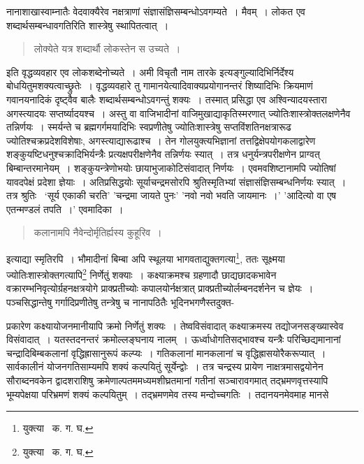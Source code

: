 \documentclass[11pt, openany]{book}
\begin{document}
\newpage

\noindent नानाशाखास्वाम्नातैः वेदवाक्यैरेव नक्षत्राणां संज्ञासंज्ञिसम्बन्धोऽवगम्यते~। मैवम्~। लोकत एव शब्दार्थसम्बन्धावगतिरिति शास्त्रेषु स्थापितत्वात्~।
\begin{quote} 
{\qt लोक्येते यत्र शब्दार्थौ लोकस्तेन स उच्यते~।}
\end{quote}

\noindent इति वृद्धव्यवहार एव लोकशब्देनोच्यते~। अमी विचृतौ नाम तारके इत्यङ्गुल्यादिभिर्निर्देश्य बोधयितुमशक्यत्वाच्छ्रुतेः~। वृद्धव्यवहारे
तु गामानयेत्यादिवाक्यप्रयोगानन्तरं शिष्यादिभिः क्रियमाणं गवानयनादिकं दृष्ट्वैव बालैः शब्दार्थसम्बन्धोऽवगन्तुं शक्यः~। तस्मात् प्रसिद्धा एव
अश्विन्यादयस्तारा अगस्त्यादयः सप्तर्ष्यादयश्च~। अस्तु वा वाजिभादीनां वाजिमुखाद्याकृतिस्मरणात् ज्योतिःशास्त्रोक्तलक्षणेनैव तन्निर्णयः~।
स्मर्यन्ते च ब्रह्मगर्गमयादिभिः स्वप्रणीतेषु ज्योतिःशास्त्रेषु सप्तविंशतिनक्षत्रारूढ ज्योतिश्चक्रप्रदेशविशेषाः, अगस्त्याद्यारूढाश्च~। तेन गोलयुक्त्यभिज्ञानां
तत्तद्विक्षेपयोगकलाद्वारेण शङ्कुयष्टिधनुश्चक्रादिभिर्यन्त्रैः प्रत्यक्षपरीक्षणेनैव तन्निर्णयः स्यात्~। तत्र धनुर्यन्त्रपरीक्षणेन प्राग्वत् बिम्बान्तरमानेयम्~।
शङ्कुयन्त्रेणोभयोः छायाभुजाकोटिसंवादात् निर्णयः~। एवमवशिष्टानामपि ज्योतिषां यावदपेक्षं प्रदेशा ज्ञेयाः~। अतिप्रसिद्धयोः
सूर्याचन्द्रमसोरपि श्रुतिस्मृतिभ्यां संज्ञासंज्ञिसम्बन्धनिर्णयः स्यात्~। तत्र श्रुतिः \textendash\ `{\qt सूर्य एकाकी चरति}' '{\qt चन्द्रमा जायते पुनः}' '{\qt नवो नवो भवति
जायमानः~।}' '{\qt आदित्यो वा एष एतन्मण्डलं तपति~।}' एवमादिका~।

\begin{quote}
{\qt कलानामपि नैवेन्दोर्मृतिर्ह्यस्य कुहूरिव~।} 
\end{quote} 

\noindent इत्याद्या स्मृतिरपि~। भौमादीनां बिम्बा अपि स्थूलया भागवताद्युक्तगत्या\renewcommand{\thefootnote}{१}\footnote{युक्त्या \textendash\ क. ग. घ.}, ततः सूक्ष्मया ज्योतिःशास्त्रोक्तगत्यापि\renewcommand{\thefootnote}{२}\footnote{युक्त्या \textendash\ क. ग. घ.} निर्णेतुं
शक्याः~। कक्ष्याक्रमश्च ग्रहणादौ छाद्यछादकभावेन वक्रारम्भनिवृत्योर्ग्रहनक्षत्रयोगे प्राक्प्रतीच्योः कपालयोर्नक्षत्रात् प्राक्प्रतीच्योर्लम्बनदर्शनेन च
ज्ञेयः~। पञ्चसिद्धान्तेषु गर्गादिप्रणीतेषु तन्त्रेषु च नानापठितैः भूदिनभगणैस्तदुक्त- 

\newpage

\noindent प्रकारेण कक्ष्यायोजनमानीयापि क्रमो निर्णेतुं शक्यः~। तेष्वविसंवादात् कक्ष्याक्रमस्य तद्योजनसङ्ख्यास्वेव विसंवादात्~। यतस्तदनन्तरं क्रमोल्लङ्घनाय नालम्~। ऊर्ध्वाधोगतिसद्भावश्च यन्त्रैः परिच्छिद्यमानानां चन्द्रादिबिम्बकलानां वृद्धिह्रासानुरूपं कल्प्यः~। गतिकलानां मानकलानां च वृद्धिह्रासयोरैकरूप्यात्~। सार्वकालीनं योजनगतिसाम्यमपि शक्यं कल्पयितुं सूर्येन्द्वोः~। तत्र चन्द्रस्य प्रायेण नाक्षत्रमासद्वयोनेन
सौराब्दनवकेन द्वादशराशिषु क्रमेणाल्पतममध्यमशीघ्रतमानां गतीनां सञ्चारावगमात् तद्भ्रमणवृत्तस्यापि भूम्यपेक्षया परिभ्रमणं शक्यं
कल्पयितुम्~। तद्भ्रमणमेव तस्य मन्दोच्चगतिः~। तदानयनमेवमाह मानसे\textendash 
\end{document}
